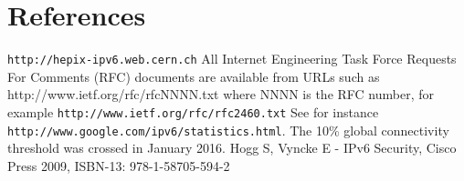 \section*{References}

\begin{thebibliography}{1}
 {\tt http://hepix-ipv6.web.cern.ch}
 All Internet Engineering Task Force Requests For Comments (RFC) documents are available
from URLs such as http://www.ietf.org/rfc/rfcNNNN.txt where NNNN is the RFC number, for example {\tt http://www.ietf.org/rfc/rfc2460.txt}
 See for instance {\tt http://www.google.com/ipv6/statistics.html}. The 10\% global connectivity threshold was crossed in January 2016.
    Hogg S, Vyncke E - IPv6 Security, Cisco Press 2009, ISBN-13: 978-1-58705-594-2
\end{thebibliography}
